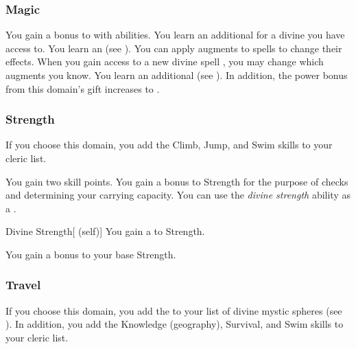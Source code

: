         \subsubsection{Magic}
             You gain a  bonus to  with  abilities.
             You learn an additional  for a divine  you have access to.
             You learn an  (see ).
            You can apply augments to spells to change their effects.
            When you gain access to a new divine spell , you may change which augments you know.
             You learn an additional  (see ).
            In addition, the power bonus from this domain's gift increases to .

        \subsubsection{Strength}
            If you choose this domain, you add the Climb, Jump, and Swim skills to your cleric  list.

             You gain two skill points.
             You gain a  bonus to Strength for the purpose of checks and determining your carrying capacity.
             You can use the \textit{divine strength} ability as a .
            \begin{attuneability}{Divine Strength}[ (self)]
                You gain a   to Strength.
            \end{attuneability}
             You gain a  bonus to your base Strength.

        \subsubsection{Travel}
            If you choose this domain, you add the   to your list of divine mystic spheres (see ).
            In addition, you add the Knowledge (geography), Survival, and Swim skills to your cleric  list.

